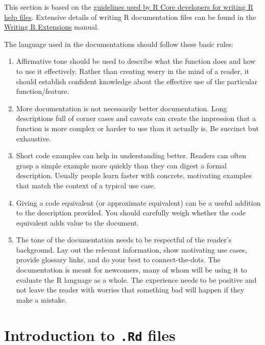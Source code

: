 \documentclass[
]{book}
\begin{document}
This section is based on the \href{https://developer.r-project.org/Rds.html}{guidelines used by R Core developers for writing R help files}. Extensive details of writing R documentation files can be found in the \href{https://cran.r-project.org/doc/manuals/r-release/R-exts.html\#Writing-R-documentation-files}{Writing R Extensions} manual.

The language used in the documentations should follow these basic rules:

\begin{enumerate}
\def\labelenumi{\arabic{enumi}.}
\item
  Affirmative tone should be used to describe what the function does and how to use it effectively. Rather than creating worry in the mind of a reader, it should establish confident knowledge about the effective use of the particular function/feature.
\item
  More documentation is not necessarily better documentation. Long descriptions full of corner cases and caveats can create the impression that a function is more complex or harder to use than it actually is. Be succinct but exhaustive.
\item
  Short code examples can help in understanding better. Readers can often grasp a simple example more quickly than they can digest a formal description. Usually people learn faster with concrete, motivating examples that match the context of a typical use case.
\item
  Giving a code equivalent (or approximate equivalent) can be a useful addition to the description provided. You should carefully weigh whether the code equivalent adds value to the document.
\item
  The tone of the documentation needs to be respectful of the reader's background. Lay out the relevant information, show motivating use cases, provide glossary links, and do your best to connect-the-dots. The documentation is meant for newcomers, many of whom will be using it to evaluate the R language as a whole. The experience needs to be positive and not leave the reader with worries that something bad will happen if they make a mistake.
\end{enumerate}

\section{\texorpdfstring{Introduction to \texttt{.Rd} files}{Introduction to .Rd files}}\label{introduction-to-.rd-files}
\end{document}

